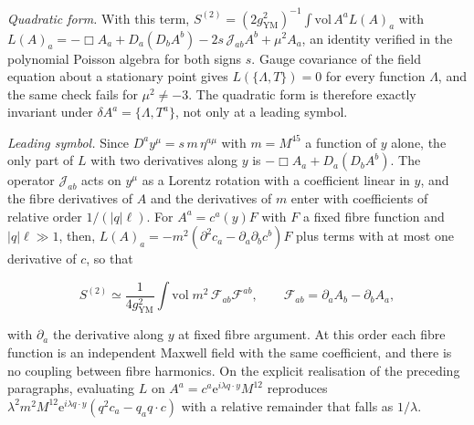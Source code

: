 \emph{Quadratic form.} With this term, \(S^{(2)}=(2g_{\mathrm{YM}}^2)^{-1}\int\mathrm{vol}\,A^aL(A)_a\) with \(L(A)_a=-\Box A_a+D_a(D_bA^b)-2s\,\mathcal J_{ab}A^b+\mu^2A_a\), an identity verified in the polynomial Poisson algebra for both signs \(s\). Gauge covariance of the field equation about a stationary point gives \(L(\{\Lambda,T\})=0\) for every function \(\Lambda\), and the same check fails for \(\mu^2\neq-3\). The quadratic form is therefore exactly invariant under \(\delta A^a=\{\Lambda,T^a\}\), not only at a leading symbol.



\emph{Leading symbol.} Since \(D^ay^\mu=s\,m\,\eta^{a\mu}\) with \(m=M^{45}\) a function of \(y\) alone, the only part of \(L\) with two derivatives along \(y\) is \(-\Box A_a+D_a(D_bA^b)\). The operator \(\mathcal J_{ab}\) acts on \(y^\mu\) as a Lorentz rotation with a coefficient linear in \(y\), and the fibre derivatives of \(A\) and the derivatives of \(m\) enter with coefficients of relative order \(1/(|q|\ell)\). For \(A^a=c^a(y)F\) with \(F\) a fixed fibre function and \(|q|\ell\gg1\), then, \(L(A)_a=-m^2(\partial^2c_a-\partial_a\partial_bc^b)F\) plus terms with at most one derivative of \(c\), so that

\[

S^{(2)}\simeq\frac{1}{4g_{\mathrm{YM}}^2}\int\mathrm{vol}\;m^2\,\mathcal F_{ab}\mathcal F^{ab},\qquad

\mathcal F_{ab}=\partial_aA_b-\partial_bA_a ,

\]

with \(\partial_a\) the derivative along \(y\) at fixed fibre argument. At this order each fibre function is an independent Maxwell field with the same coefficient, and there is no coupling between fibre harmonics. On the explicit realisation of the preceding paragraphs, evaluating \(L\) on \(A^a=c^a\mathrm e^{i\lambda q\cdot y}M^{12}\) reproduces \(\lambda^2m^2M^{12}\mathrm e^{i\lambda q\cdot y}(q^2c_a-q_aq\cdot c)\) with a relative remainder that falls as \(1/\lambda\).



